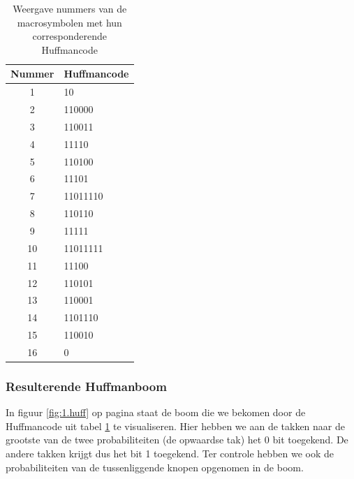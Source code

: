 \documentclass[11pt,a4paper]{article}
\begin{document}
\begin{table}
\centering
\begin{tabular}{c|l}
Nummer & Huffmancode \\
\hline
1 & 10\\
\hline
2 & 110000\\
\hline
3 & 110011\\
\hline
4 & 11110\\
\hline
5 & 110100\\
\hline
6 & 11101\\
\hline
7 & 11011110\\
\hline
8 & 110110\\
\hline
9 & 11111\\
\hline
10 & 11011111\\
\hline
11 & 11100\\
\hline
12 & 110101\\
\hline
13 & 110001\\
\hline
14 & 1101110\\
\hline
15 & 110010\\
\hline
16 & 0\\
\end{tabular} 
\caption{Weergave nummers van de macrosymbolen met hun corresponderende Huffmancode}
\label{tab:1.2}
\end{table}

\subsubsection{Resulterende Huffmanboom}

In figuur \ref{fig:1.huff} op pagina \pageref{fig:1.huff} staat de boom die we bekomen door de Huffmancode uit tabel \ref{tab:1.2} te visualiseren. Hier hebben we aan de takken naar de grootste van de twee probabiliteiten (de opwaardse tak) het 0 bit toegekend. De andere takken krijgt dus het bit 1 toegekend. Ter controle hebben we ook de probabiliteiten van de tussenliggende knopen opgenomen in de boom.
\end{document}
